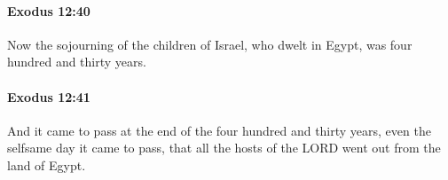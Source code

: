 		\paragraph{Exodus 12:40} %
			\label{EXODUS-12-40}

			Now the sojourning of the children of Israel, who dwelt in Egypt, was four hundred and thirty years.


		\paragraph{Exodus 12:41} %
			\label{EXODUS-12-41}

			And it came to pass at the end of the four hundred and thirty years, even the selfsame day it came to pass, that all the hosts of the LORD went out from the land of Egypt.


